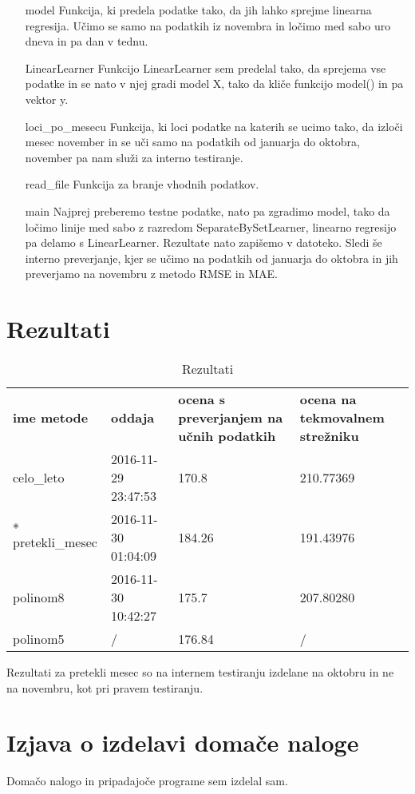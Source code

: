 \documentclass[a4paper,11pt]{article}
\begin{document}
\begin{itemize}
	\item[model]
	Funkcija, ki predela podatke tako, da jih lahko sprejme linearna regresija. 			Učimo se samo na podatkih iz novembra in ločimo med sabo uro dneva in pa dan v 			tednu.
	\item[LinearLearner]
	Funkcijo LinearLearner sem predelal tako, da sprejema vse podatke in se nato v 			njej gradi model X, tako da kliče funkcijo model() in pa vektor y. 
	\item[loci{\_}po{\_}mesecu]
	Funkcija, ki loci podatke na katerih se ucimo tako, da izloči mesec november in 		se uči samo na podatkih od januarja do oktobra, november pa nam služi za interno 	testiranje.
	\item[read{\_}file]
	Funkcija za branje vhodnih podatkov.
	\item[main]
	Najprej preberemo testne podatke, nato pa zgradimo model, tako da ločimo linije 		med sabo z razredom SeparateBySetLearner, linearno regresijo pa delamo s 				LinearLearner. Rezultate nato zapišemo v datoteko. Sledi še interno preverjanje, 	kjer se učimo na podatkih od januarja do oktobra in jih preverjamo na novembru z 	metodo RMSE in MAE.
\end{itemize}

\section{Rezultati} 
\begin{table}[ht]
\centering
\caption{Rezultati}
\label{my-label}
\begin{tabular}{llll}
\textbf{ime metode} & \textbf{oddaja}     & \textbf{ocena s preverjanjem na učnih podatkih} & \textbf{ocena na tekmovalnem strežniku} \\
celo\_leto          & 2016-11-29 23:47:53 & 170.8                                           & 210.77369                               \\
${\ast}$pretekli\_mesec    & 2016-11-30 01:04:09 & 184.26                                          & 191.43976                               \\
polinom8            & 2016-11-30 10:42:27 & 175.7                                           & 207.80280                               \\
polinom5            & /                   & 176.84                                          & /                                      
\end{tabular}
\end{table}
Rezultati za pretekli mesec so na internem testiranju izdelane na oktobru in ne na novembru, kot pri pravem testiranju.

\section{Izjava o izdelavi domače naloge}
Domačo nalogo in pripadajoče programe sem izdelal sam.
\end{document}
